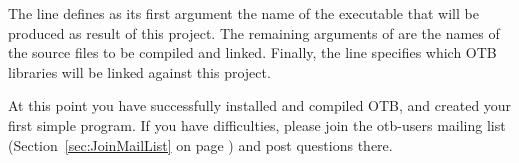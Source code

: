 
The line 
defines as its first argument the name of the executable that will be produced
as result of this project. The remaining arguments of 
are the names of the source files to be compiled and linked.  Finally, the
 line specifies which OTB libraries will be
linked against this project.




At this point you have successfully installed and compiled OTB, and created
your first simple program. If you have difficulties, please join the
otb-users mailing list (Section~\ref{sec:JoinMailList} on page
\pageref{sec:JoinMailList}) and post questions there.
